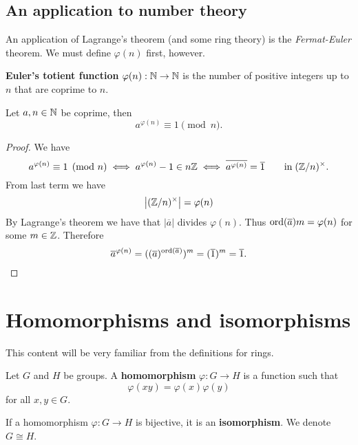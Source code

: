 \section{An application to number theory}

An application of Lagrange's theorem (and some ring theory) is 
the \emph{Fermat-Euler} theorem.
We must define $\varphi(n)$ first, however.

\begin{definition}
    \textbf{Euler's totient function} $\varphi(n): \mathbb{N} \to \mathbb{N}$
    is the number of positive integers up to $n$ that are coprime to $n$.
\end{definition}

\begin{theorem}
    Let $a,n \in \mathbb{N}$ be coprime, then
    \[
        a^{\varphi(n)} \equiv 1 \pmod n.
    \]
\end{theorem}

\begin{proof}
    We have 
    \[
        a^{\varphi(n)} \equiv 1 \pmod n
        \iff a^{\varphi(n)} - 1 \in n\mathbb{Z}
        \iff \overline{a^{\varphi(n)}} = \overline 1 \qquad \text{in}\; 
        (\mathbb{Z}/n)^\times.
    \]
    From last term we have
    \[
        \left\lvert (\mathbb{Z}/n)^\times \right\rvert = \varphi(n)
    \]
    By Lagrange's theorem we have that 
    $\lvert \overline a \rvert$
    divides
    $\varphi(n)$.
    Thus $\operatorname{ord}(\overline a)m = \varphi(n)$ for some $m \in \mathbb{Z}$.
    Therefore
    \[
        \overline a^{\varphi(n)}
        = ((\overline a)^{\operatorname{ord}(\overline a)})^m
        = (\overline 1)^m
        = \overline 1.
    \]
\end{proof}

\chapter{Homomorphisms and isomorphisms}

This content will be very familiar from the definitions for rings.

\begin{definition}[Homomorphism]
    Let $G$ and $H$ be groups.
    A \textbf{homomorphism} $\varphi: G \to H$ is a function
    such that
    \[
        \varphi(xy) = \varphi(x)\varphi(y)
    \]
    for all $x, y\in G$.
\end{definition}

If a homomorphism $\varphi: G \to H$ is bijective, it is an \textbf{isomorphism}.
We denote $G \cong H$.

